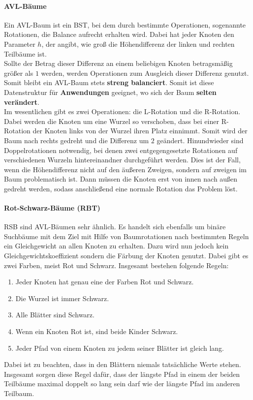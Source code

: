 \documentclass{article}
\begin{document}
\paragraph{AVL-Bäume}
Ein AVL-Baum ist ein BST, bei dem durch bestimmte Operationen, sogenannte Rotationen, die Balance aufrecht erhalten wird. Dabei hat jeder Knoten den Parameter $h$, der angibt, wie groß die Höhendifferenz der linken und rechten Teilbäume ist.\\
Sollte der Betrag dieser Differenz an einem beliebigen Knoten betragsmäßig größer als $1$ werden, werden Operationen zum Ausgleich dieser Differenz genutzt. Somit bleibt ein AVL-Baum stets \textbf{streng balanciert}. Somit ist diese Datenstruktur für \textbf{Anwendungen} geeignet, wo sich der Baum \textbf{selten verändert}.\\
Im wesentlichen gibt es zwei Operationen: die L-Rotation und die R-Rotation. Dabei werden die Knoten um eine Wurzel so verschoben, dass bei einer R-Rotation der Knoten links von der Wurzel ihren Platz einnimmt. Somit wird der Baum nach rechts gedreht und die Differenz um $2$ geändert. Hinundwieder sind Doppelrotationen notwendig, bei denen zwei entgegengesetzte Rotationen auf verschiedenen Wurzeln hintereinandner durchgeführt werden. Dies ist der Fall, wenn die Höhendifferenz nicht auf den äußeren Zweigen, sondern auf zweigen im Baum problematisch ist. Dann müssen die Knoten erst von innen nach außen gedreht werden, sodass anschließend eine normale Rotation das Problem löst.
\paragraph{Rot-Schwarz-Bäume (RBT)}
RSB sind AVL-Bäumen sehr ähnlich. Es handelt sich ebenfalls um binäre Suchbäume mit dem Ziel mit Hilfe von Baumrotationen nach bestimmten Regeln ein Gleichgewicht an allen Knoten zu erhalten. Dazu wird nun jedoch kein Gleichgewichtskoeffizient sondern die Färbung der Knoten genutzt. Dabei gibt es zwei Farben, meist Rot und Schwarz. Insgesamt bestehen folgende Regeln:
\begin{enumerate}
    \item Jeder Knoten hat genau eine der Farben Rot und Schwarz.
    \item Die Wurzel ist immer Schwarz.
    \item Alle Blätter sind Schwarz.
    \item Wenn ein Knoten Rot ist, sind beide Kinder Schwarz.
    \item Jeder Pfad von einem Knoten zu jedem seiner Blätter ist gleich lang. 
\end{enumerate}
Dabei ist zu beachten, dass in den Blättern niemals tatsächliche Werte stehen.\\
Insgesamt sorgen diese Regel dafür, dass der längste Pfad in einem der beiden Teilbäume maximal doppelt so lang sein darf wie der längste Pfad im anderen Teilbaum.
\end{document}
